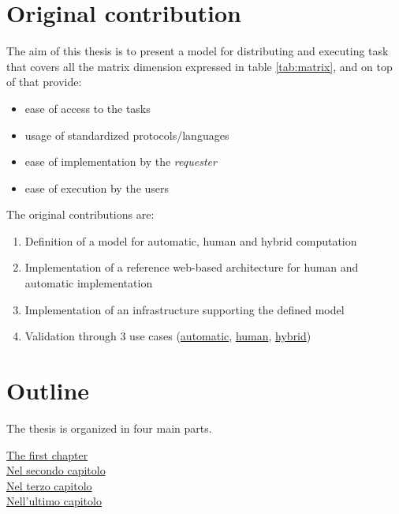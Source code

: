 \section*{Original contribution}
The aim of this thesis is to present a model for distributing and executing task that covers all
the matrix dimension expressed in table \ref{tab:matrix}, and on top of that provide:
\begin{itemize}
	\item ease of access to the tasks
	\item usage of standardized protocols/languages
	\item ease of implementation by the \emph{requester}
	\item ease of execution by the users
\end{itemize}

The original contributions are:
\begin{enumerate}
	\item Definition of a model for automatic, human and hybrid computation
	\item Implementation of a reference web-based architecture for human and automatic implementation
	\item Implementation of an infrastructure supporting the defined model
	\item Validation through 3 use cases (\hyperref[sec:cases:automatic]{automatic},
	\hyperref[sec:cases:human]{human}, \hyperref[sec:cases:hybrid]{hybrid})
\end{enumerate}







\section*{Outline}
The thesis is organized in four main parts.

\begin{description}
	\item[{\hyperref[cap:bg]{The first chapter}}]

	\item[{\hyperref[cap:model]{Nel secondo capitolo}}]

	\item[{\hyperref[cap:cases]{Nel terzo capitolo}}]

	\item[{\hyperref[cap:implementation]{Nell'ultimo capitolo}}]
\end{description}